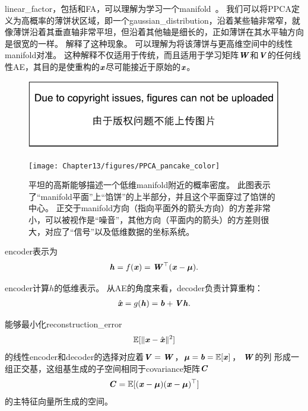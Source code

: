 \gls{linear_factor}，包括和\gls{FA}，可以理解为学习一个\gls{manifold}~\citep{hinton97modelling}。
我们可以将\gls{PPCA}定义为高概率的薄饼状区域，即一个\gls{gaussian_distribution}，沿着某些轴非常窄，就像薄饼沿着其垂直轴非常平坦，但沿着其他轴是细长的，正如薄饼在其水平轴方向是很宽的一样。
解释了这种现象。
可以理解为将该薄饼与更高维空间中的线性\gls{manifold}对准。
这种解释不仅适用于传统，而且适用于学习矩阵$\boldsymbol{\mathit{W}}$和$\boldsymbol{\mathit{V}}$的任何线性\gls{AE}，其目的是使重构的$\boldsymbol{\mathit{x}}$尽可能接近于原始的$\boldsymbol{\mathit{x}}$。

\begin{figure}[!htb]
\ifOpenSource
\centerline{\includegraphics{figure.pdf}}
\else
	\centerline{\texttt{[image: Chapter13/figures/PPCA\_pancake\_color]}}
\fi
\caption{平坦的高斯能够描述一个低维\gls{manifold}附近的概率密度。
此图表示了``\gls{manifold}平面''上``馅饼''的上半部分，并且这个平面穿过了馅饼的中心。
正交于\gls{manifold}方向（指向平面外的箭头方向）的方差非常小，可以被视作是``噪音''，其他方向（平面内的箭头）的方差则很大，对应了``信号''以及低维数据的坐标系统。}
\label{fig:PPCA_pancake}
\end{figure}


\gls{encoder}表示为
\begin{align}
\label{eqn:1319}
\boldsymbol{\mathit{h}}  = f(\boldsymbol{\mathit{x}}) = \boldsymbol{\mathit{W}}^{\top} (\boldsymbol{\mathit{x}} - \boldsymbol{\mu}).
\end{align}


\gls{encoder}计算$h$的低维表示。
从\gls{AE}的角度来看，\gls{decoder}负责计算重构：
\begin{align}
\label{eqn:1320}
\hat{\boldsymbol{\mathit{x}}} = g(\boldsymbol{\mathit{h}}) = \boldsymbol{\mathit{b}} + \boldsymbol{\mathit{V}} \boldsymbol{\mathit{h}}.
\end{align}


能够最小化\gls{reconstruction_error}
\begin{align}
\label{eqn:1321}
\mathbb{E}[\Vert\boldsymbol{\mathit{x}} - \hat{\boldsymbol{\mathit{x}}}\Vert^2]
\end{align}
的线性\gls{encoder}和\gls{decoder}的选择对应着$\boldsymbol{\mathit{V}} = \boldsymbol{\mathit{W}}$，${\boldsymbol{\mu}} = \boldsymbol{\mathit{b}} = \mathbb{E}[\boldsymbol{\mathit{x}}]$， $\boldsymbol{\mathit{W}}$的列 形成一组正交基，这组基生成的子空间相同于\gls{covariance}矩阵$\boldsymbol{\mathit{C}}$
\begin{align}
\label{eqn:1322}
\boldsymbol{\mathit{C}} = \mathbb{E}[(\boldsymbol{\mathit{x}} - {\boldsymbol{\mu}})(\boldsymbol{\mathit{x}} - {\boldsymbol{\mu}})^{\top}]
\end{align}
的主特征向量所生成的空间。



